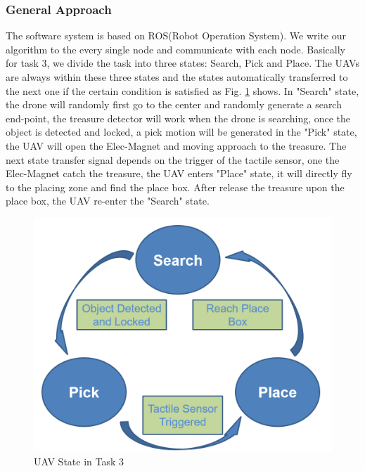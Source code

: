 \documentclass{standalone}
\begin{document}
\subsubsection{General Approach}
The software system is based on ROS(Robot Operation System). We write our algorithm to the every single node and communicate with each node. Basically for task 3, we divide the task into three states: Search, Pick and Place. The UAVs are always within these three states and the states automatically transferred to the next one if the certain condition is satisfied as Fig. \ref{t3state} shows. In "Search" state, the drone will randomly first go to the center and randomly generate a search end-point, the treasure detector will work when the drone is searching, once the object is detected and locked, a pick motion will be generated in the "Pick" state, the UAV will open the Elec-Magnet and moving approach to the treasure. The next state transfer signal depends on the trigger of the tactile sensor, one the Elec-Magnet catch the treasure, the UAV enters "Place" state, it will directly fly to the placing zone and find the place box. After release the treasure upon the place box, the UAV re-enter the "Search" state.
 \begin{figure}%
    \begin{center}
        \includegraphics[keepaspectratio=true, width=1\linewidth, height=0.20\textheight]{img//task3state.png}
      \end{center}
    \caption{UAV State in Task 3}
    \label{t3state}
    \end{figure}
\end{document}
